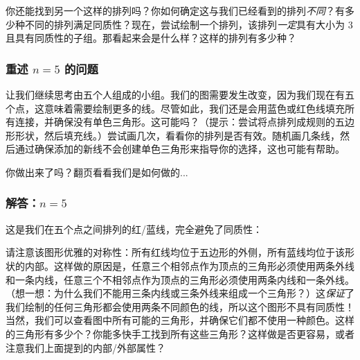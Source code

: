 你还能找到另一个这样的排列吗？你如何确定这与我们已经看到的排列\emph{不同}？有多少种不同的排列满足同质性？现在，尝试绘制一个排列，该排列\emph{一定}具有大小为 $3$ 且具有同质性的子组。那看起来会是什么样？这样的排列有多少种？

\subsubsection*{重述 $n = 5$ 的问题}

让我们继续思考由五个人组成的小组。我们的图需要发生改变，因为我们现在有五个点，这意味着需要绘制更多的线。尽管如此，我们还是会用蓝色或红色线填充所有连接，并确保没有单色三角形。这可能吗？（提示：尝试将点排列成规则的五边形形状，然后填充线。）尝试画几次，看看你的排列是否有效。随机画几条线，然后通过确保添加的新线不会创建单色三角形来指导你的选择，这也可能有帮助。

你做出来了吗？翻页看看我们是如何做的...

\clearpage

\subsubsection*{解答：$n=5$}

这是我们在五个点之间排列的红/蓝线，完全避免了同质性：

\begin{center}
\end{center}

请注意该图形优雅的对称性：所有红线均位于五边形的外侧，所有蓝线均位于该形状的内部。这样做的原因是，任意三个相邻点作为顶点的三角形必须使用两条外线和一条内线，任意三个不相邻点作为顶点的三角形必须使用两条内线和一条外线。（想一想：为什么我们不能用三条内线或三条外线来组成一个三角形？）这\emph{保证}了我们绘制的任何三角形都会使用两条不同颜色的线，所以这个图形不具有同质性！当然，我们可以查看图中所有可能的三角形，并确保它们都不使用一种颜色。这样的三角形有多少个？你能多快手工找到所有这些三角形？这样做是否更容易，或者注意我们上面提到的内部/外部属性？

